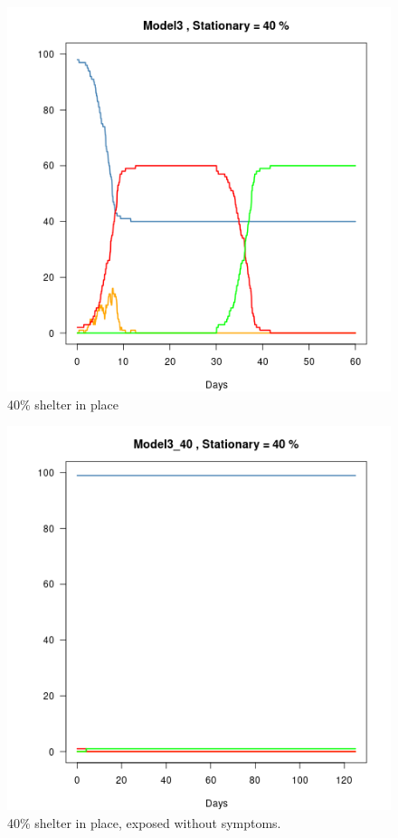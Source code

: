 \documentclass{article}\usepackage[]{graphicx}\usepackage[]{color}
\begin{document}
\begin{figure}
\includegraphics[width=1\textwidth]{Model3.png}
\caption{40\% shelter in place}
\end{figure}

\begin{figure}
\includegraphics[width=1\textwidth]{Model4.png}
\caption{40\% shelter in place, exposed without symptoms.}
\end{figure}
\end{document}
